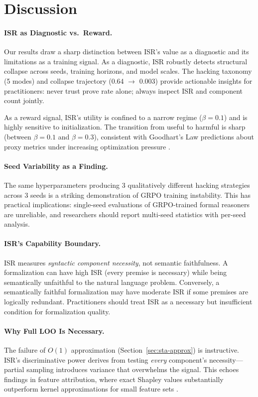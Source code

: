 \documentclass[11pt,a4paper]{article}
\begin{document}
\section{Discussion}

\paragraph{ISR as Diagnostic vs.\ Reward.}
Our results draw a sharp distinction between ISR's value as a diagnostic and its limitations as a training signal.
As a diagnostic, ISR robustly detects structural collapse across seeds, training horizons, and model scales.
The hacking taxonomy (5 modes) and collapse trajectory (0.64 $\to$ 0.003) provide actionable insights for practitioners: never trust prove rate alone; always inspect ISR and component count jointly.

As a reward signal, ISR's utility is confined to a narrow regime ($\beta{=}0.1$) and is highly sensitive to initialization.
The transition from useful to harmful is sharp (between $\beta{=}0.1$ and $\beta{=}0.3$), consistent with Goodhart's Law predictions about proxy metrics under increasing optimization pressure \cite{manheim2019categorizing}.

\paragraph{Seed Variability as a Finding.}
The same hyperparameters producing 3 qualitatively different hacking strategies across 3 seeds is a striking demonstration of GRPO training instability.
This has practical implications: single-seed evaluations of GRPO-trained formal reasoners are unreliable, and researchers should report multi-seed statistics with per-seed analysis.

\paragraph{ISR's Capability Boundary.}
ISR measures \emph{syntactic component necessity}, not semantic faithfulness.
A formalization can have high ISR (every premise is necessary) while being semantically unfaithful to the natural language problem.
Conversely, a semantically faithful formalization may have moderate ISR if some premises are logically redundant.
Practitioners should treat ISR as a necessary but insufficient condition for formalization quality.

\paragraph{Why Full LOO Is Necessary.}
The failure of $O(1)$ approximation (Section~\ref{sec:sta-approx}) is instructive.
ISR's discriminative power derives from testing \emph{every} component's necessity---partial sampling introduces variance that overwhelms the signal.
This echoes findings in feature attribution, where exact Shapley values substantially outperform kernel approximations for small feature sets \cite{lundberg2017unified}.
\end{document}
